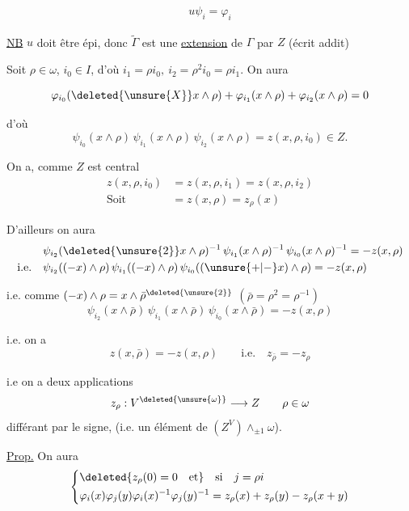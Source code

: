 \[
 u\psi_i=\varphi_i
\]

\uline{NB} $u$ doit être épi, donc $\widetilde\Gamma$ est une \uline{extension} de $\Gamma$ par $Z$ (écrit addit\textsuperscript{})

Soit $\rho\in\omega$, $i_0\in I$, d'où $i_1=\rho i_0,\ i_2=\rho^2i_0=\rho i_1$. On aura

\[
 \varphi_{i_0}(\deleted{\unsure{X}}x\wedge\rho)+\varphi_{i_1}(x\wedge\rho)+\varphi_{i_2}(x\wedge\rho)=0
\]

d'où
\[
 \psi_{i_0}(x\wedge\rho)\,\psi_{i_1}(x\wedge\rho)\,\psi_{i_2}(x\wedge\rho)
 =z(x,\rho,i_0)\in Z.
\]

On a, comme $Z$ est central
\[
 \begin{aligned}
 z(x,\rho,i_0)&=z(x,\rho,i_1)=z(x,\rho,i_2)\\
 \text{Soit}\qquad&=z(x,\rho)=z_\rho(x)
 \end{aligned}
\]

D'ailleurs on aura
\[
 \begin{aligned}
 &\psi_{i_2}(\deleted{\unsure{2}}x\wedge\rho)^{-1}\,\psi_{i_1}(x\wedge\rho)^{-1}\,
 \psi_{i_0}(x\wedge\rho)^{-1}=-z(x,\rho)\\
 \text{i.e.}\quad&\psi_{i_2}((-x)\wedge\rho)\,\psi_{i_1}((-x)\wedge\rho)\,
 \psi_{i_0}((\unsure{+|-}x)\wedge\rho)=-z(x,\rho)
 \end{aligned}
\]

i.e.  comme $(-x)\wedge\rho=x\wedge\bar\rho^{\deleted{\unsure{2}}}$
$(\bar\rho=\rho^2=\rho^{-1})$
\[
 \psi_{i_2}(x\wedge\bar\rho)\,\psi_{i_1}(x\wedge\bar\rho)\,\psi_{i_0}(x\wedge\bar\rho)
 =-z(x,\rho)
\]

i.e. on a
\[
 z(x,\bar\rho)=-z(x,\rho)\qquad\text{i.e.}\quad z_{\bar\rho}=-z_\rho
\]

i.e on a deux applications
\[
 z_\rho:V^{\deleted{\unsure{\omega}}}\longrightarrow Z\qquad \rho\in\omega
\]
différant par le signe, (i.e. un élément de $(Z^V)\wedge_{\pm1}\omega$). 

\uline{Prop.} On aura
\[
 \left\{\begin{aligned}
 &\deleted{z_\rho(0)=0\quad\text{et}}\quad\text{si}\quad j=\rho i\\
 &\varphi_i(x)\varphi_j(y)\varphi_i(x)^{-1}\varphi_j(y)^{-1}
 =z_\rho(x)+z_\rho(y)-z_\rho(x+y)
 \end{aligned}\right.
\]

